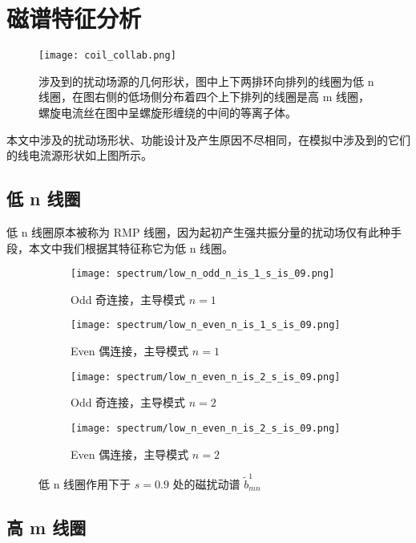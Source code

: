   


\section{磁谱特征分析}

\begin{figure}[htbp]
  \centering%
      \texttt{[image: coil\_collab.png]}
      \caption{涉及到的扰动场源的几何形状，图中上下两排环向排列的线圈为低 n 线圈，在图右侧的低场侧分布着四个上下排列的线圈是高 m 线圈，螺旋电流丝在图中呈螺旋形缠绕的中间的等离子体。}
\end{figure}

本文中涉及的扰动场形状、功能设计及产生原因不尽相同，在模拟中涉及到的它们的线电流源形状如上图所示。

\subsection{低 n 线圈}
低 n 线圈原本被称为 RMP 线圈，因为起初产生强共振分量的扰动场仅有此种手段，本文中我们根据其特征称它为低 n 线圈。


\begin{figure}[htbp]
  \centering%
  \begin{subfigure}{0.45\textwidth}
    \texttt{[image: spectrum/low\_n\_odd\_n\_is\_1\_s\_is\_09.png]}
    \caption{Odd 奇连接，主导模式 $n=1$}
  \end{subfigure}%
  \begin{subfigure}{0.45\textwidth}
    \texttt{[image: spectrum/low\_n\_even\_n\_is\_1\_s\_is\_09.png]}
    \caption{Even 偶连接，主导模式 $n=1$}
  \end{subfigure}
  
  \begin{subfigure}{0.45\textwidth}
    \texttt{[image: spectrum/low\_n\_even\_n\_is\_2\_s\_is\_09.png]}
    \caption{Odd 奇连接，主导模式 $n=2$}
  \end{subfigure}
  \begin{subfigure}{0.45\textwidth}
    \texttt{[image: spectrum/low\_n\_even\_n\_is\_2\_s\_is\_09.png]}
    \caption{Even 偶连接，主导模式 $n=2$}
  \end{subfigure}
  \caption{低 n 线圈作用下于 $s=0.9$ 处的磁扰动谱 $\tilde{b}^1_{mn}$}
  \label{fig:highm-three-subfig-poincare}
\end{figure}




\subsection{高 m 线圈}

